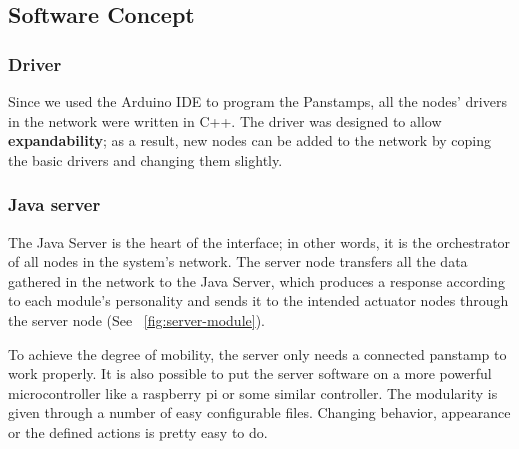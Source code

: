 
\subsection{Software Concept} 

\subsubsection{Driver} 
Since we used the Arduino IDE to program the Panstamps, all the nodes' drivers in the network were written in C++. The driver was designed to allow \textbf{expandability}; as a result, new nodes can be added to the network by coping the basic drivers and changing them slightly. 


\subsubsection{Java server}

The Java Server is the heart of the interface; in other words, it is the orchestrator of all nodes in the system's network. The server node transfers all the data gathered in the network to the Java Server, which produces a response according to each module's personality and sends it to the intended actuator nodes through the server node (See ~\ref{fig:server-module}).  



To achieve the degree of mobility, the server only needs a connected panstamp to work properly. It is also possible to put the server software on a more powerful microcontroller like a raspberry pi or some similar controller.
The modularity is given through a number of easy configurable files. Changing behavior, appearance or the defined actions is pretty easy to do.

